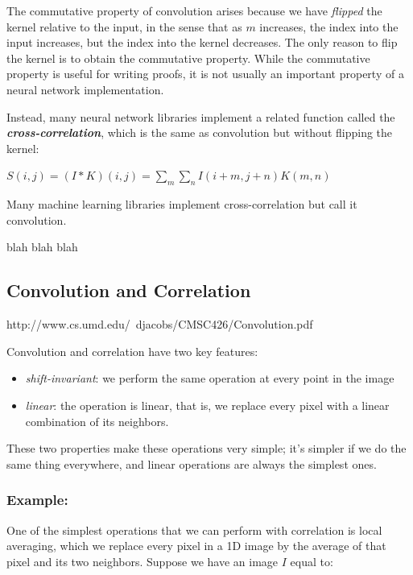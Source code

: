 \documentclass{report}
\begin{document}
The commutative property of convolution arises because we have \textit{flipped} the kernel relative to the input, in the sense that as $m$ increases, the index into the input increases, but the index into the kernel decreases. The only reason to flip the kernel is to obtain the commutative property. While the commutative property is useful for writing proofs, it is not usually an important property of a neural network implementation.\newline

\noindent Instead, many neural network libraries implement a related function called the \textbf{\textit{cross-correlation}}, which is the same as convolution but without flipping the kernel:\newline\newline
    \centerline{$S(i,j)=(I*K)(i,j)=\sum_m \sum_n I(i+m,j+n)K(m,n)$}\newline\newline
    
Many machine learning libraries implement cross-correlation but call it convolution. 

blah blah blah

\subsection{Convolution and Correlation}
http://www.cs.umd.edu/~djacobs/CMSC426/Convolution.pdf

Convolution and correlation have two key features:
\begin{itemize}
	\item \textit{shift-invariant}: we perform the same operation at every point in the image
    \item \textit{linear}: the operation is linear, that is, we replace every pixel with a linear combination of its neighbors.
\end{itemize}

These two properties make these operations very simple; it's simpler if we do the same thing everywhere, and linear operations are always the simplest ones.

\subsubsection{Example:}
One of the simplest operations that we can perform with correlation is local averaging, which we replace every pixel in a 1D image by the average of that pixel and its two neighbors. Suppose we have an image $I$ equal to:
\end{document}
